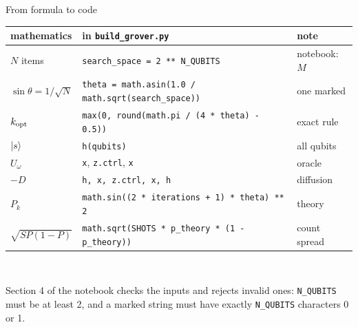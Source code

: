 \documentclass[aspectratio=169,11pt]{beamer}
\newcommand{\Uo}{U_\omega}
\begin{document}
\begin{frame}{From formula to code}
  \centering\footnotesize
  \begin{tabular}{lll}
    \toprule
    mathematics & in \texttt{build\_grover.py} & note\\
    \midrule
    $N$ items & \texttt{search\_space = 2 ** N\_QUBITS} & notebook: $M$\\
    $\sin\theta = 1/\sqrt N$ & \texttt{theta = math.asin(1.0 / math.sqrt(search\_space))} & one marked\\
    $k_{\rm opt}$ & \texttt{max(0, round(math.pi / (4 * theta) - 0.5))} & exact rule\\
    $\ket{s}$ & \texttt{h(qubits)} & all qubits\\
    $\Uo$ & \texttt{x}, \texttt{z.ctrl}, \texttt{x} & oracle\\
    $-D$ & \texttt{h, x, z.ctrl, x, h} & diffusion\\
    $P_k$ & \texttt{math.sin((2 * iterations + 1) * theta) ** 2} & theory\\
    $\sqrt{SP(1 - P)}$ & \texttt{math.sqrt(SHOTS * p\_theory * (1 - p\_theory))} & count spread\\
    \bottomrule
  \end{tabular}\\[3mm]
  \raggedright\normalsize
  Section 4 of the notebook checks the inputs and rejects invalid ones: \texttt{N\_QUBITS} must be at least 2, and a marked string must have exactly \texttt{N\_QUBITS} characters 0 or 1.
\end{frame}
\end{document}
